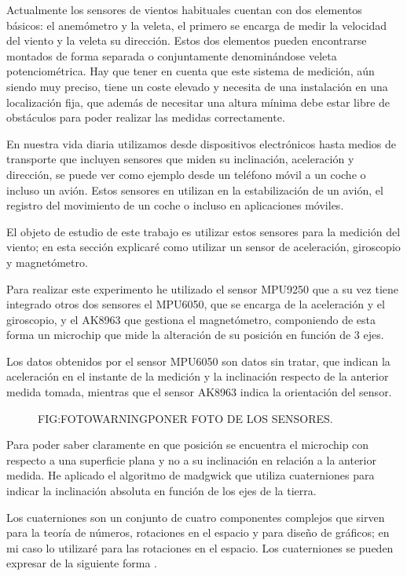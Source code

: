 
 Actualmente los sensores de vientos habituales cuentan con dos elementos básicos: el anemómetro y la veleta, el primero se encarga de medir la velocidad del viento y la veleta su dirección. Estos dos elementos pueden encontrarse montados de forma separada o conjuntamente denominándose veleta potenciométrica.
 Hay que tener en cuenta que este sistema de medición, aún siendo muy preciso, tiene un coste elevado y necesita de una instalación en una localización fija, que además de necesitar una altura mínima debe estar libre de obstáculos para poder realizar las medidas correctamente.
 
 En nuestra vida diaria utilizamos desde dispositivos electrónicos hasta medios de transporte que incluyen sensores que miden su inclinación, aceleración y dirección, se puede ver como ejemplo desde un teléfono móvil a un coche o incluso un avión.
 Estos sensores en utilizan en la estabilización de un avión, el registro del movimiento de un coche o incluso en aplicaciones móviles.
 
 El objeto de estudio de este trabajo es utilizar estos sensores para la medición del viento; en esta sección explicaré como utilizar un sensor de aceleración, giroscopio y magnetómetro.
 
 Para realizar este experimento he utilizado el sensor MPU9250\cite{InvenSense2016} que a su vez tiene integrado otros dos sensores el MPU6050, que se encarga de la aceleración y el giroscopio, y el AK8963 que gestiona el magnetómetro, componiendo de esta forma un microchip que mide la alteración de su posición en función de 3 ejes.
 
 Los datos obtenidos por el sensor MPU6050 son datos sin tratar, que indican la aceleración en el instante de la medición y la inclinación respecto de la anterior medida tomada, mientras que el sensor AK8963 indica la orientación del sensor.
 
\begin{figure}[Sensor MPU0250]{FIG:FOTOWARNING}{PONER FOTO DE LOS SENSORES.}
\end{figure}
 
 Para poder saber claramente en que posición se encuentra el microchip con respecto a una superficie plana y no a su inclinación en relación a la anterior medida. He aplicado el algoritmo de madgwick que utiliza cuaterniones para indicar la inclinación absoluta en función de los ejes de la tierra. 
 
 Los cuaterniones son un conjunto de cuatro componentes complejos que sirven para la teoría de números, rotaciones en el espacio y para diseño de gráficos; en mi caso lo utilizaré para las rotaciones en el espacio. Los cuaterniones se pueden expresar de la siguiente forma \cite{Graves1999}.
 
